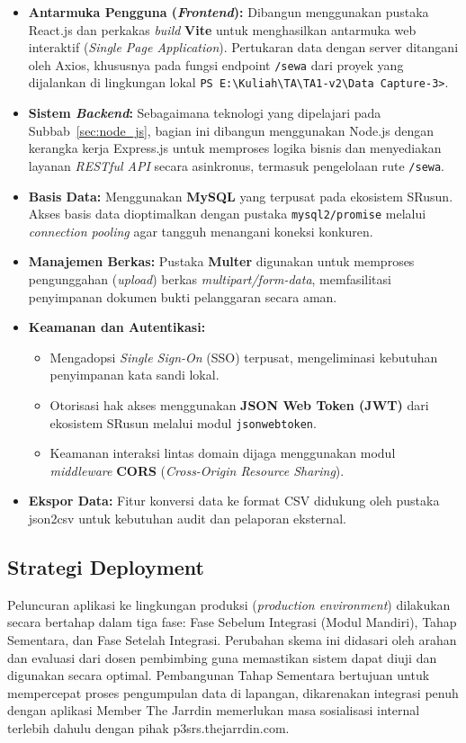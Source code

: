 \begin{itemize}
    \item \textbf{Antarmuka Pengguna (\textit{Frontend}):} Dibangun menggunakan pustaka {React.js} dan perkakas \textit{build} \textbf{Vite} untuk menghasilkan antarmuka web interaktif (\textit{Single Page Application}). Pertukaran data dengan server ditangani oleh {Axios}, khususnya pada fungsi endpoint \texttt{/sewa} dari proyek yang dijalankan di lingkungan lokal \texttt{PS E:\textbackslash Kuliah\textbackslash TA\textbackslash TA1-v2\textbackslash Data Capture-3>}.  
    \item \textbf{Sistem \textit{Backend}:} Sebagaimana teknologi yang dipelajari pada Subbab~\ref{sec:node_js}, bagian ini dibangun menggunakan {Node.js} dengan kerangka kerja {Express.js} untuk memproses logika bisnis dan menyediakan layanan \textit{RESTful API} secara asinkronus, termasuk pengelolaan rute \texttt{/sewa}.
    \item \textbf{Basis Data:} Menggunakan \textbf{MySQL} yang terpusat pada ekosistem SRusun. Akses basis data dioptimalkan dengan pustaka \texttt{mysql2/promise} melalui \textit{connection pooling} agar tangguh menangani koneksi konkuren.
    \item \textbf{Manajemen Berkas:} Pustaka \textbf{Multer} digunakan untuk memproses pengunggahan (\textit{upload}) berkas \textit{multipart/form-data}, memfasilitasi penyimpanan dokumen bukti pelanggaran secara aman.
    \item \textbf{Keamanan dan Autentikasi:} 
    \begin{itemize}
        \item Mengadopsi \textit{Single Sign-On} (SSO) terpusat, mengeliminasi kebutuhan penyimpanan kata sandi lokal.
        \item Otorisasi hak akses menggunakan \textbf{JSON Web Token (JWT)} dari ekosistem SRusun melalui modul \texttt{jsonwebtoken}.
        \item Keamanan interaksi lintas domain dijaga menggunakan modul \textit{middleware} \textbf{CORS} (\textit{Cross-Origin Resource Sharing}).
    \end{itemize} 
    \item \textbf{Ekspor Data:} Fitur konversi data ke format {CSV} didukung oleh pustaka {json2csv} untuk kebutuhan audit dan pelaporan eksternal.
\end{itemize}



\subsection{Strategi Deployment} 
Peluncuran aplikasi ke lingkungan produksi (\textit{production environment}) dilakukan secara bertahap dalam tiga fase: Fase Sebelum Integrasi (Modul Mandiri), Tahap Sementara, dan Fase Setelah Integrasi. Perubahan skema ini didasari oleh arahan dan evaluasi dari dosen pembimbing guna memastikan sistem dapat diuji dan digunakan secara optimal. Pembangunan Tahap Sementara bertujuan untuk mempercepat proses pengumpulan data di lapangan, dikarenakan integrasi penuh dengan aplikasi {Member} The Jarrdin memerlukan masa sosialisasi internal terlebih dahulu dengan pihak p3srs.thejarrdin.com.

